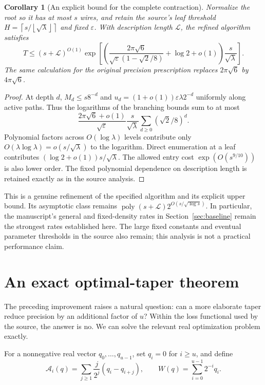 \documentclass[11pt,letterpaper]{article}
\numberwithin{equation}{section}
\newtheorem{corollary}[theorem]{Corollary}
\theoremstyle{definition}
\theoremstyle{remark}
\newcommand{\poly}{\operatorname{poly}}
\newcommand{\ceil}[1]{\left\lceil #1\right\rceil}
\newcommand{\floor}[1]{\left\lfloor #1\right\rfloor}
\begin{document}
\begin{corollary}[An explicit bound for the complete contraction]
\label{cor:global}
Normalize the root so it has at most $s$ wires, and retain the source's
leaf threshold $H=\ceil{s/\floor{\sqrt\lambda}}$ and fixed $\varepsilon$.
With description length $\mathcal L$, the refined algorithm satisfies
\begin{equation}
 T\le(s+\mathcal L)^{O(1)}
 \exp\!\left[
 \left(\frac{2\pi\sqrt6}
 {\sqrt\varepsilon(1-\sqrt2/8)}+\log2+o(1)\right)
 \frac{s}{\sqrt\lambda}\right].
 \label{eq:global-explicit}
\end{equation}
The same calculation for the original precision prescription replaces
$2\pi\sqrt6$ by $4\pi\sqrt6$.
\end{corollary}
\begin{proof}
At depth $d$, $M_d\le s8^{-d}$ and
$u_d=(1+o(1))\varepsilon\lambda2^{-d}$ uniformly along active paths.
Thus the logarithms of the branching bounds sum to at most
\[
 \frac{2\pi\sqrt6+o(1)}{\sqrt\varepsilon}
 \frac{s}{\sqrt\lambda}
 \sum_{d\ge0}(\sqrt2/8)^d.
\]
Polynomial factors across $O(\log\lambda)$ levels contribute only
$O(\lambda\log\lambda)=o(s/\sqrt\lambda)$ to the logarithm.
Direct enumeration at a leaf contributes
$(\log2+o(1))s/\sqrt\lambda$. The allowed entry cost
$\exp(O(s^{9/10}))$ is also lower order. The fixed polynomial dependence
on description length is retained exactly as in the source analysis.
\end{proof}

This is a genuine refinement of the specified algorithm and its explicit
upper bound. Its asymptotic class remains
$\poly(s+\mathcal L)2^{O(s/\sqrt{\log s})}$. In particular, the manuscript's
general and fixed-density rates in Section~\ref{sec:baseline} remain the
strongest rates established here. The large fixed constants and eventual
parameter thresholds in the source also remain; this analysis is not a
practical performance claim.

\section{An exact optimal-taper theorem}
\label{sec:optimal}

The preceding improvement raises a natural question: can a more elaborate
taper reduce precision by an additional factor of $u$? Within the loss
functional used by the source, the answer is no. We can solve the relevant
real optimization problem exactly.

For a nonnegative real vector $q_0,\ldots,q_{u-1}$, set $q_i=0$ for
$i\ge u$, and define
\[
 \mathcal A_i(q)=\sum_{j\ge1}\frac{j}{2^j}(q_i-q_{i+j}),
 \qquad W(q)=\sum_{i=0}^{u-1}2^{-i}q_i.
\]
\end{document}
